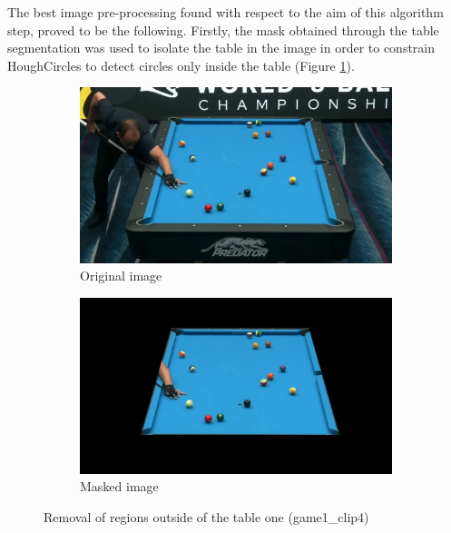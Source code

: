 The best image pre-processing found with respect to the aim of this algorithm step, proved to be the following.
Firstly, the mask obtained through the table segmentation was used to isolate the table in the image
in order to constrain HoughCircles to detect circles only inside the table (Figure \ref{fig:masking}). \\
\begin{figure}[h!]
    \centering
    \begin{subfigure}[b]{0.45\textwidth}
        \centering
        \includegraphics[width=\textwidth]{imgs/ball_localization/original.jpg}
        \caption{Original image}
    \end{subfigure}
    \hspace{0.05\textwidth}
    \begin{subfigure}[b]{0.45\textwidth}
        \centering
        \includegraphics[width=\textwidth]{imgs/ball_localization/masked.jpg}
        \caption{Masked image}
    \end{subfigure}
    \caption{Removal of regions outside of the table one (game1\_clip4)}
    \label{fig:masking}
\end{figure}

